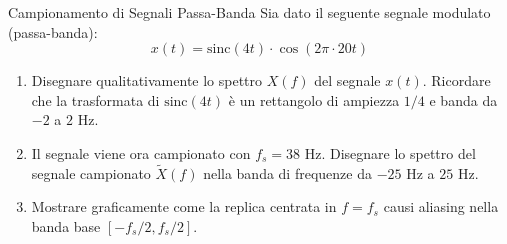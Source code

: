 
\begin{esercizio}{Campionamento di Segnali Passa-Banda}
    Sia dato il seguente segnale modulato (passa-banda):
    \[
        x(t) = \text{sinc}(4t) \cdot \cos(2\pi \cdot 20t)
    \]
    \begin{enumerate}
        \item Disegnare qualitativamente lo spettro $X(f)$ del segnale $x(t)$. Ricordare che la trasformata di $\text{sinc}(4t)$ è un rettangolo di ampiezza $1/4$ e banda da $-2$ a $2$ Hz.
        \item Il segnale viene ora campionato con $f_s = 38$ Hz. Disegnare lo spettro del segnale campionato $\tilde{X}(f)$ nella banda di frequenze da $-25$ Hz a $25$ Hz.
        \item Mostrare graficamente come la replica centrata in $f=f_s$ causi aliasing nella banda base $[ -f_s/2, f_s/2 ]$.
    \end{enumerate}
\end{esercizio}
